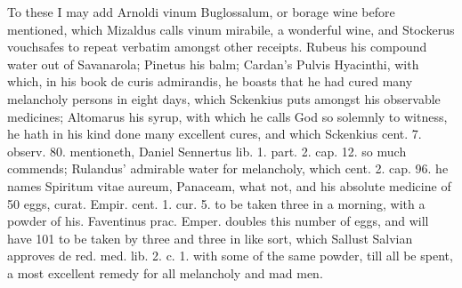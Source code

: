 To these I may add Arnoldi vinum Buglossalum, or borage wine before
mentioned, which Mizaldus calls vinum mirabile, a wonderful wine,
and Stockerus vouchsafes to repeat verbatim amongst other receipts.
Rubeus his compound water out of Savanarola; Pinetus his balm;
Cardan's Pulvis Hyacinthi, with which, in his book de curis admirandis,
he boasts that he had cured many melancholy persons in eight days,
which Sckenkius puts amongst his observable medicines; Altomarus
his syrup, with which he calls God so solemnly to witness, he
hath in his kind done many excellent cures, and which Sckenkius cent.
7. observ. 80. mentioneth, Daniel Sennertus lib. 1. part. 2. cap. 12.
so much commends; Rulandus' admirable water for melancholy, which cent.
2. cap. 96. he names Spiritum vitae aureum, Panaceam, what not, and his
absolute medicine of 50 eggs, curat. Empir. cent. 1. cur. 5. to be
taken three in a morning, with a powder of his. Faventinus prac.
Emper. doubles this number of eggs, and will have 101 to be taken by
three and three in like sort, which Sallust Salvian approves de red.
med. lib. 2. c. 1. with some of the same powder, till all be spent, a
most excellent remedy for all melancholy and mad men.

